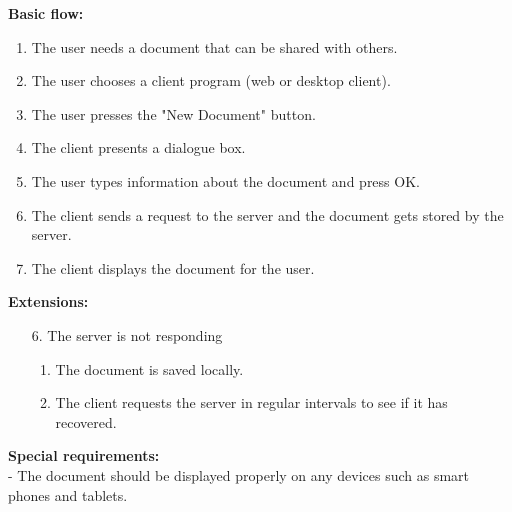 \documentclass[11pt,a4paper]{article}
\begin{document}
{\begin{minipage}{\columnwidth}
		\textbf{Basic flow:} 
		\begin{enumerate}
			\item The user needs a document that can be shared with others.
			\item The user chooses a client program (web or desktop client).
			\item The user presses the "New Document" button.
			\item The client presents a dialogue box.
			\item The user types information about the document and press OK.
			\item The client sends a request to the server and the document gets stored by the server.
			\item The client displays the document for the user.
		\end{enumerate} 
		\textbf{Extensions:}
			\begin{enumerate}
				\item[6.]  The server is not responding \\
				\begin{enumerate}
					\item The document is saved locally.
					\item The client requests the server in regular intervals to see if it has recovered.
				\end{enumerate}
			\end{enumerate}
		\textbf{Special requirements:} \\
		- The document should be displayed properly on any devices such as smart phones and tablets. \\
\end{minipage}}
\end{document}

